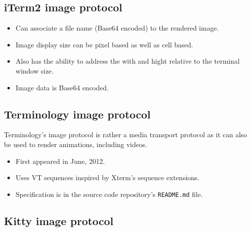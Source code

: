 \documentclass[a4paper]{article}
\begin{document}
\subsection{iTerm2 image protocol}

\begin{itemize}
    \item Can associate a file name (Base64 encoded) to the rendered image.
    \item Image display size can be pixel based as well as cell based.
    \item Also has the ability to address the with and hight relative to the terminal window size.
    \item Image data is Base64 encoded.
\end{itemize}


\subsection{Terminology image protocol}

Terminology's image protocol is rather a media transport protocol as it
can also be used to render animations, including videos.

\begin{itemize}
    \item First appeared in June, 2012.
    \item Uses VT sequences inspired by Xterm's sequence extensions.
    \item Specification is in the source code repository's \texttt{README.md} file.
\end{itemize}

\subsection{Kitty image protocol}
\end{document}
